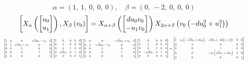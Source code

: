 \documentclass[11pt]{article}
\theoremstyle{definition}
\begin{document}
\[
\alpha = \left( 1, \  1, \  0, \  0, \  0\right), \quad \beta = \left( 0, \  -2, \  0, \  0, \  0\right)
\]
\[
\scaletoalign{\textwidth}{\left[ X_{\alpha}\left(\left[\begin{matrix}u_{0}\\u_{1}\end{matrix}\right]\right), X_{\beta}\left(v_{0}\right) \right] = X_{\alpha + \beta}\left(\left[\begin{matrix}d u_{0} v_{0}\\- u_{1} v_{0}\end{matrix}\right]\right) X_{2\alpha + \beta}\left(v_{0} \left(- d u_{0}^{2} + u_{1}^{2}\right)\right)}
\]
\[
\scaletoalign{\textwidth}{{\left[\begin{matrix}1 & 0 & 0 & \sqrt{d} u_{0} - u_{1} & 0\\0 & 1 & \sqrt{d} u_{0} + u_{1} & 0 & 0\\0 & 0 & 1 & 0 & 0\\0 & 0 & 0 & 1 & 0\\0 & 0 & 0 & 0 & 1\end{matrix}\right]} {\left[\begin{matrix}1 & 0 & 0 & 0 & 0\\0 & 1 & 0 & 0 & 0\\0 & 0 & 1 & 0 & 0\\0 & \sqrt{d} v_{0} & 0 & 1 & 0\\0 & 0 & 0 & 0 & 1\end{matrix}\right]} {\left[\begin{matrix}1 & 0 & 0 & - \sqrt{d} u_{0} + u_{1} & 0\\0 & 1 & - \sqrt{d} u_{0} - u_{1} & 0 & 0\\0 & 0 & 1 & 0 & 0\\0 & 0 & 0 & 1 & 0\\0 & 0 & 0 & 0 & 1\end{matrix}\right]} {\left[\begin{matrix}1 & 0 & 0 & 0 & 0\\0 & 1 & 0 & 0 & 0\\0 & 0 & 1 & 0 & 0\\0 & - \sqrt{d} v_{0} & 0 & 1 & 0\\0 & 0 & 0 & 0 & 1\end{matrix}\right]} = {\left[\begin{matrix}1 & v_{0} \left(- \sqrt{d} u_{1} + d u_{0}\right) & \sqrt{d} v_{0} \left(- d u_{0}^{2} + u_{1}^{2}\right) & 0 & 0\\0 & 1 & 0 & 0 & 0\\0 & 0 & 1 & 0 & 0\\0 & 0 & - v_{0} \left(\sqrt{d} u_{1} + d u_{0}\right) & 1 & 0\\0 & 0 & 0 & 0 & 1\end{matrix}\right]}}
\]
\end{document}
